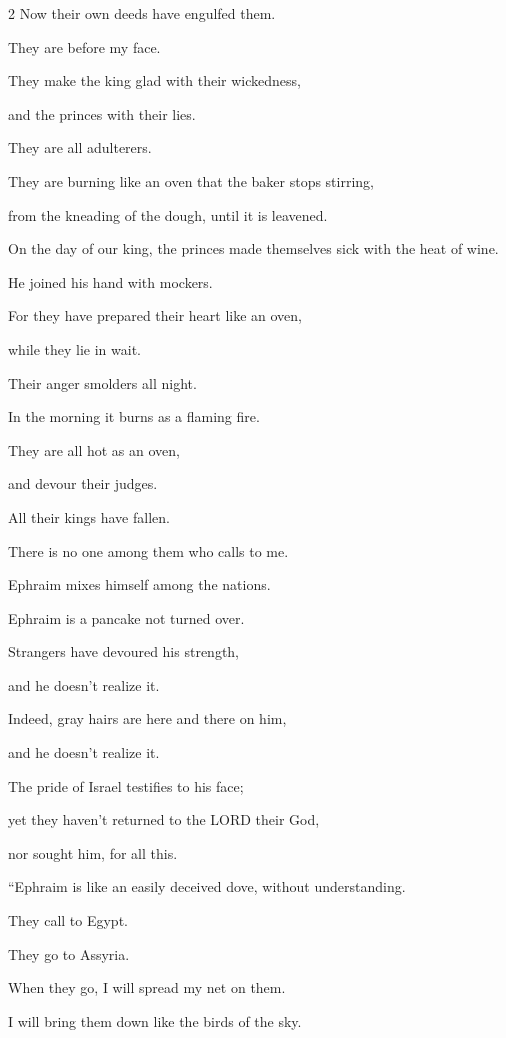 \begin{multicols}{2}
Now their own deeds have engulfed them.

They are before my face.

\myverse{}They make the king glad with their wickedness,

and the princes with their lies.

\myverse{}They are all adulterers.

They are burning like an oven that the baker stops stirring,

from the kneading of the dough, until it is leavened.

\myverse{}On the day of our king, the princes made themselves sick with
the heat of wine.

He joined his hand with mockers.

\myverse{}For they have prepared their heart like an oven,

while they lie in wait.

Their anger smolders all night.

In the morning it burns as a flaming fire.

\myverse{}They are all hot as an oven,

and devour their judges.

All their kings have fallen.

There is no one among them who calls to me.

\myverse{}Ephraim mixes himself among the nations.

Ephraim is a pancake not turned over.

\myverse{}Strangers have devoured his strength,

and he doesn’t realize it.

Indeed, gray hairs are here and there on him,

and he doesn’t realize it.

\myverse{}The pride of Israel testifies to his face;

yet they haven’t returned to the LORD their God,

nor sought him, for all this.


\vspace{\baselineskip} \myverse{}“Ephraim is like an easily deceived dove, without understanding.

They call to Egypt.

They go to Assyria.

\myverse{}When they go, I will spread my net on them.

I will bring them down like the birds of the sky.


\end{multicols}
